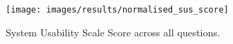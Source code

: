 
\begin{figure}[H]
	\centering
    \texttt{[image: images/results/normalised\_sus\_score]}
    \caption{System Usability Scale Score across all questions.}
    \label{fig:sus_score_questions}
\end{figure}
